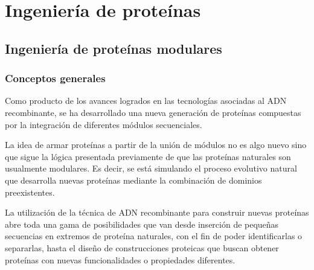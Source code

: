 %             
       
\section{Ingeniería de proteínas}\label{proteinEngineering}
\subsection{Ingeniería de proteínas modulares}    
\subsubsection{Conceptos generales}
Como producto de los avances logrados en las tecnologías asociadas al ADN recombinante, se ha desarrollado una nueva generación de proteínas compuestas por la integración
de diferentes módulos secuenciales.

La idea de armar proteínas a partir de la unión de módulos no es algo nuevo sino que sigue la lógica presentada previamente de que las proteínas naturales son usualmente modulares. 
Es decir, se está simulando el proceso evolutivo natural que desarrolla nuevas proteínas mediante la combinación de dominios preexistentes.

La utilización de la técnica de ADN recombinante para construir nuevas proteínas abre toda una gama de posibilidades que van desde inserción de pequeñas secuencias en extremos de proteína naturales, 
con el fin de poder identificarlas o separarlas, hasta el diseño de construcciones proteicas que buscan obtener proteínas con nuevas funcionalidades o propiedades diferentes.

